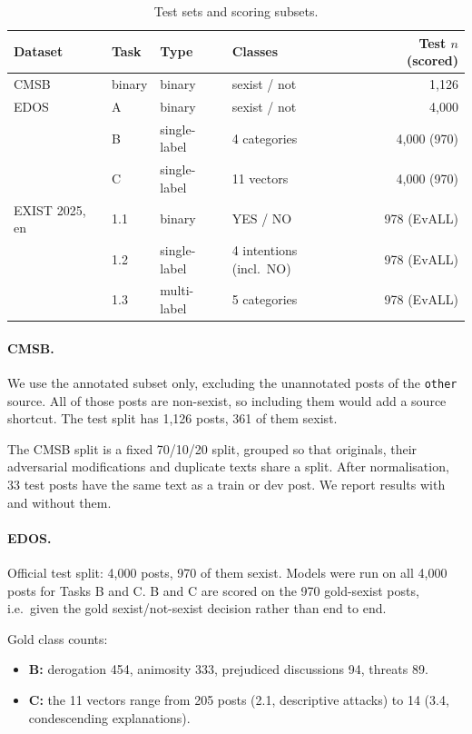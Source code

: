 \documentclass[11pt]{article}
\begin{document}
\begin{table}[t]
\centering\small
\caption{Test sets and scoring subsets.}\label{tab:tasks}
\begin{tabular}{llllr}
\toprule
Dataset & Task & Type & Classes & Test $n$ (scored) \\
\midrule
CMSB \citep{samory2021callme} & binary & binary & sexist / not & 1{,}126 \\
EDOS \citep{kirk2023semeval} & A & binary & sexist / not & 4{,}000 \\
 & B & single-label & 4 categories & 4{,}000 (970) \\
 & C & single-label & 11 vectors & 4{,}000 (970) \\
EXIST 2025, en \citep{plaza2025exist} & 1.1 & binary & YES / NO & 978 (EvALL) \\
 & 1.2 & single-label & 4 intentions (incl.\ NO) & 978 (EvALL) \\
 & 1.3 & multi-label & 5 categories & 978 (EvALL) \\
\bottomrule
\end{tabular}
\end{table}

\paragraph{CMSB.} We use the annotated subset only, excluding the unannotated posts of the \texttt{other} source. All of those posts are non-sexist, so including them would add a source shortcut. The test split has 1{,}126 posts, 361 of them sexist.

The CMSB split is a fixed 70/10/20 split, grouped so that originals, their adversarial modifications and duplicate texts share a split. After normalisation, 33 test posts have the same text as a train or dev post. We report results with and without them.

\paragraph{EDOS.} Official test split: 4{,}000 posts, 970 of them sexist. Models were run on all 4{,}000 posts for Tasks B and C. B and C are scored on the 970 gold-sexist posts, i.e.\ given the gold sexist/not-sexist decision rather than end to end.

Gold class counts:
\begin{itemize}
  \item \textbf{B:} derogation 454, animosity 333, prejudiced discussions 94, threats 89.
  \item \textbf{C:} the 11 vectors range from 205 posts (2.1, descriptive attacks) to 14 (3.4, condescending explanations).
\end{itemize}
\end{document}
